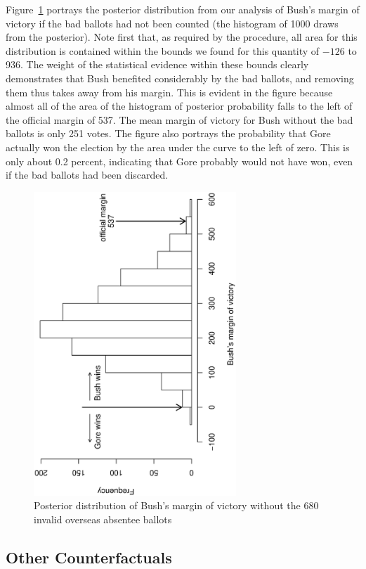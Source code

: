 \documentclass[11pt,titlepage]{article}
\begin{document}
Figure~\ref{fg:margin} portrays the posterior distribution from our
analysis of Bush's margin of victory if the bad ballots had not been
counted (the histogram of 1000 draws from the posterior).  Note first
that, as required by the procedure, all area for this distribution is
contained within the bounds we found for this quantity of $-126$ to
936.  The weight of the statistical evidence within these bounds
clearly demonstrates that Bush benefited considerably by the bad
ballots, and removing them thus takes away from his margin.  This is
evident in the figure because almost all of the area of the histogram
of posterior probability falls to the left of the official margin of
537.  The mean margin of victory for Bush without the bad ballots is
only 251 votes.  The figure also portrays the probability that Gore
actually won the election by the area under the curve to the left of
zero.  This is only about 0.2 percent, indicating that Gore probably
would not have won, even if the bad ballots had been discarded.
\begin{figure}[t]
\begin{center}
\includegraphics[width=3in,height=4.5in,angle=-90]{margin}
\caption{Posterior distribution of Bush's margin of victory without the
  680 invalid overseas absentee ballots} \label{fg:margin}
\end{center} 
\end{figure}

\subsection{Other Counterfactuals}
\end{document}
